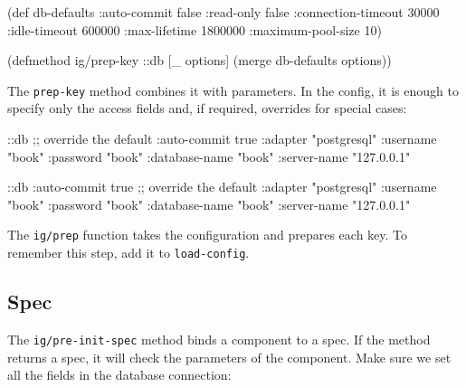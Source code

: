 \begin{english}
  \begin{clojure}
(def db-defaults
  {:auto-commit        false
   :read-only          false
   :connection-timeout 30000
   :idle-timeout       600000
   :max-lifetime       1800000
   :maximum-pool-size  10})

(defmethod ig/prep-key ::db
  [_ options]
  (merge db-defaults options))
  \end{clojure}
\end{english}

The \verb|prep-key| method combines it with parameters. In the config, it is enough to specify only the access fields and, if required, overrides for special cases:

\ifnarrow

\begin{english}
  \begin{clojure}
{::db {;; override the default
       :auto-commit   true
       :adapter       "postgresql"
       :username      "book"
       :password      "book"
       :database-name "book"
       :server-name   "127.0.0.1"}}
  \end{clojure}
\end{english}

\else

\begin{english}
  \begin{clojure}
{::db {:auto-commit   true ;; override the default
       :adapter       "postgresql"
       :username      "book"
       :password      "book"
       :database-name "book"
       :server-name   "127.0.0.1"}}
  \end{clojure}
\end{english}

\fi

The \verb|ig/prep| function takes the configuration and prepares each key. To remember this step, add it to \verb|load-config|.

\subsection{Spec}


The \verb|ig/pre-init-spec| method binds a component to a spec. If the method returns a spec, it will check the parameters of the component. Make sure we set all the fields in the database connection:

\ifnarrow

